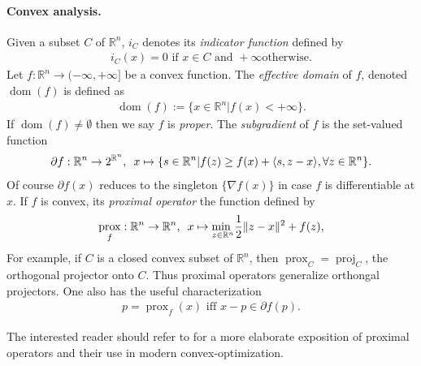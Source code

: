 \documentclass{article} %
\DeclareMathOperator{\dom}{dom}
\DeclareMathOperator{\proj}{proj}
\DeclareMathOperator{\prox}{prox}
\begin{document}
\paragraph{\textbf{Convex analysis.}}
Given a subset $C$ of $\mathbb{R}^n$,
$i_C$ denotes its \textit{indicator function} defined by
\begin{eqnarray}
  i_C(x) = 0 \text{ if } x \in C\text{ and }+\infty\text{
    otherwise.}
\end{eqnarray}
Let $f : \mathbb{R}^n \rightarrow (-\infty, +\infty]$ be a convex
  function.
The \textit{effective domain} of $f$, denoted $\dom(f)$ is defined as
\begin{eqnarray}
  \dom(f) := \{x \in \mathbb{R}^n | f(x) < +\infty\}.
\end{eqnarray}
 If $\dom(f) \ne \emptyset$ then we say $f$ is \textit{proper}.
The \textit{subgradient} of $f$ is the set-valued function
\begin{eqnarray}
\partial f: \mathbb{R}^n \rightarrow 2^{\mathbb{R}^n}, \hspace{.5em} x \mapsto
\{s\in \mathbb{R}^n | f(z)  \ge f(x) + \langle s, z - x\rangle, \forall
z \in \mathbb{R}^n\}.
\end{eqnarray}
Of course $\partial f(x)$ reduces to the singleton $\{\nabla f(x)\}$
in case $f$ is differentiable at $x$. If $f$ is convex, its
\textit{proximal operator} the function defined by
\begin{eqnarray}
  \prox_f: \mathbb{R}^n \rightarrow \mathbb{R}^n,\hspace{.5em}x
  \mapsto \underset{z \in \mathbb{R}^n}{\text{min }}\frac{1}{2}\|z
  - x\|^2 + f(z),
\end{eqnarray}
For example, if $C$ is a closed convex subset of $\mathbb{R}^n$, then
$\prox_C = \proj_C$, the orthogonal projector onto $C$. Thus proximal
operators generalize orthongal projectors. One also has the useful
characterization
\begin{eqnarray}
  p = \prox_f(x)\text{ iff } x - p \in \partial f(p).
\end{eqnarray}

The interested reader should refer to
\cite{combettes2011proximal} for
a more elaborate exposition of proximal operators and their
use in modern convex-optimization.
\end{document}
